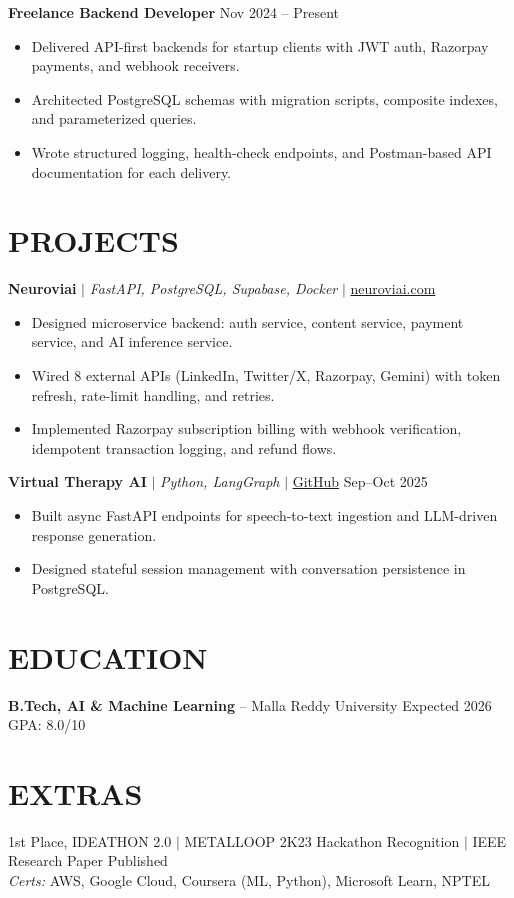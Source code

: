 \documentclass[10pt]{article}
\begin{document}
\textbf{Freelance Backend Developer} \hfill Nov 2024 -- Present
\begin{itemize}
\item Delivered API-first backends for startup clients with JWT auth, Razorpay payments, and webhook receivers.
\item Architected PostgreSQL schemas with migration scripts, composite indexes, and parameterized queries.
\item Wrote structured logging, health-check endpoints, and Postman-based API documentation for each delivery.
\end{itemize}

\section*{PROJECTS}
\textbf{Neuroviai} $|$ \textit{FastAPI, PostgreSQL, Supabase, Docker} $|$ \href{https://neuroviai.com}{neuroviai.com}
\begin{itemize}
\item Designed microservice backend: auth service, content service, payment service, and AI inference service.
\item Wired 8 external APIs (LinkedIn, Twitter/X, Razorpay, Gemini) with token refresh, rate-limit handling, and retries.
\item Implemented Razorpay subscription billing with webhook verification, idempotent transaction logging, and refund flows.
\end{itemize}

\textbf{Virtual Therapy AI} $|$ \textit{Python, LangGraph} $|$ \href{https://github.com/JeetInTech/Virtual-Therapist---LangGraph-Agentic-AI-System}{GitHub} \hfill Sep--Oct 2025
\begin{itemize}
\item Built async FastAPI endpoints for speech-to-text ingestion and LLM-driven response generation.
\item Designed stateful session management with conversation persistence in PostgreSQL.
\end{itemize}

\section*{EDUCATION}
\textbf{B.Tech, AI \& Machine Learning} -- Malla Reddy University \hfill Expected 2026 \hfill GPA: 8.0/10

\section*{EXTRAS}
1st Place, IDEATHON 2.0 $|$ METALLOOP 2K23 Hackathon Recognition $|$ IEEE Research Paper Published \\
\textit{Certs:} AWS, Google Cloud, Coursera (ML, Python), Microsoft Learn, NPTEL
\end{document}
